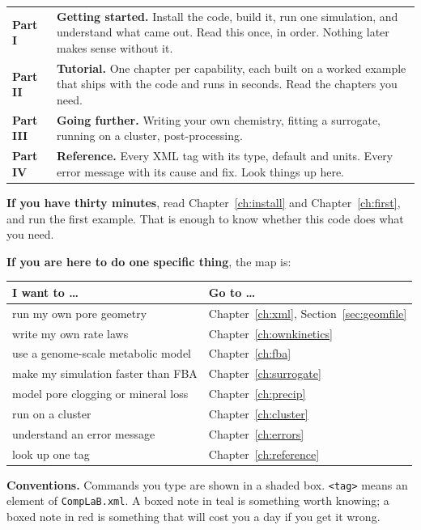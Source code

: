 \documentclass[11pt,a4paper]{report}
\newcommand{\tg}[1]{\texttt{<#1>}}
\newcommand{\file}[1]{\texttt{#1}}
\begin{document}
\vspace{4pt}
\begin{tabular}{@{}p{3.4cm}p{12cm}@{}}
\toprule
\textbf{Part I} & \textbf{Getting started.} Install the code, build it, run one
simulation, and understand what came out. Read this once, in order. Nothing
later makes sense without it.\\
\textbf{Part II} & \textbf{Tutorial.} One chapter per capability, each built on
a worked example that ships with the code and runs in seconds. Read the
chapters you need.\\
\textbf{Part III} & \textbf{Going further.} Writing your own chemistry, fitting
a surrogate, running on a cluster, post-processing.\\
\textbf{Part IV} & \textbf{Reference.} Every XML tag with its type, default and
units. Every error message with its cause and fix. Look things up here.\\
\bottomrule
\end{tabular}

\vspace{10pt}
\textbf{If you have thirty minutes}, read Chapter~\ref{ch:install} and
Chapter~\ref{ch:first}, and run the first example. That is enough to know
whether this code does what you need.

\vspace{6pt}
\textbf{If you are here to do one specific thing}, the map is:

\vspace{4pt}
\begin{tabular}{@{}p{7.6cm}p{7.6cm}@{}}
\toprule
I want to \dots & Go to \dots\\
\midrule
run my own pore geometry & Chapter~\ref{ch:xml}, Section~\ref{sec:geomfile}\\
write my own rate laws & Chapter~\ref{ch:ownkinetics}\\
use a genome-scale metabolic model & Chapter~\ref{ch:fba}\\
make my simulation faster than FBA & Chapter~\ref{ch:surrogate}\\
model pore clogging or mineral loss & Chapter~\ref{ch:precip}\\
run on a cluster & Chapter~\ref{ch:cluster}\\
understand an error message & Chapter~\ref{ch:errors}\\
look up one tag & Chapter~\ref{ch:reference}\\
\bottomrule
\end{tabular}

\vspace{12pt}
\begin{cbnote}
\textbf{\color{cbTeal}Conventions.}\quad
Commands you type are shown in a shaded box. \tg{tag} means an element of
\file{CompLaB.xml}. A boxed note in teal is something worth knowing; a boxed
note in red is something that will cost you a day if you get it wrong.
\end{cbnote}

\tableofcontents






\end{document}
